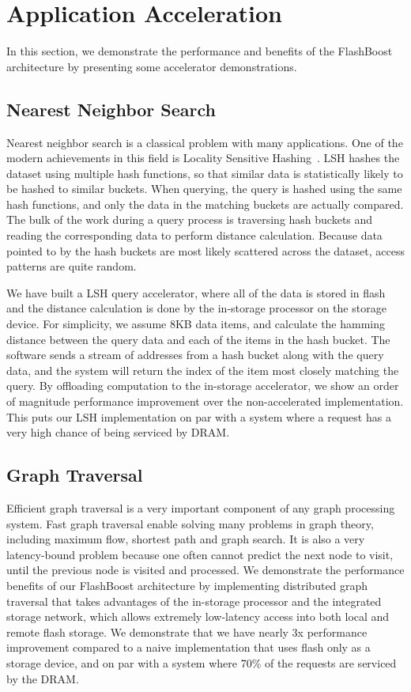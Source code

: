 \section{Application Acceleration}
\label{sec:acceleration}

In this section, we demonstrate the performance and benefits of the FlashBoost
architecture by presenting some accelerator demonstrations. 

\subsection{Nearest Neighbor Search}

Nearest neighbor search is a classical problem with many applications. One of
the modern achievements in this field is Locality Sensitive Hashing~\cite{lsh}.
LSH hashes the dataset using multiple hash functions, so that
similar data is statistically likely to be hashed to similar buckets. When
querying, the query is hashed using the same hash functions, and only the data
in the matching buckets are actually compared. The bulk of the work during a
query process is traversing hash buckets and reading the corresponding data to
perform distance calculation. Because data pointed to by the hash buckets are
most likely scattered across the dataset, access patterns are quite random.

We have built a LSH query accelerator, where all of the data is stored in flash
and the distance calculation is done by the in-storage processor on the storage
device. For simplicity, we assume 8KB data items, and calculate the hamming
distance between the query data and each of the items in the hash bucket. The
software sends a stream of addresses from a hash bucket along with the query
data, and the system will return the index of the item most closely matching the
query. By offloading computation to the in-storage accelerator, we
show an order of magnitude performance improvement over the non-accelerated
implementation. This puts our LSH implementation on par with a system where a
request has a very high chance of being serviced by DRAM.



\subsection{Graph Traversal}

Efficient graph traversal is a very important component of any graph processing
system. Fast graph traversal enable solving many problems in graph theory,
including maximum flow, shortest path and graph search. It is also a very
latency-bound problem because one often cannot predict the next node to visit,
until the previous node is visited and processed. We demonstrate the performance
benefits of our FlashBoost architecture by implementing distributed graph
traversal that takes advantages of the in-storage processor and the integrated
storage network, which allows extremely low-latency access into both local and
remote flash storage.  We demonstrate that we have nearly 3x
performance improvement compared to a naive implementation that uses flash only
as a storage device, and on par with a system where 70\% of the requests are
serviced by the DRAM.

